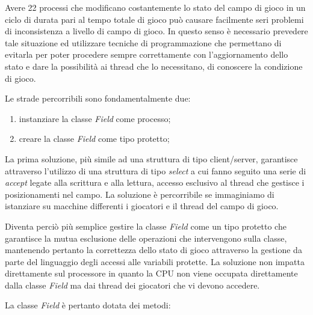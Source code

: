 \documentclass[aps,letterpaper,10pt]{article}
\begin{document}
Avere 22 processi che modificano costantemente lo stato del campo di gioco in un ciclo di durata pari al tempo totale di
gioco pu\`o causare facilmente seri problemi di inconsistenza a livello di campo di gioco. In questo senso \`e
necessario prevedere tale situazione ed utilizzare tecniche di programmazione che permettano di evitarla per poter
procedere sempre correttamente con l'aggiornamento dello stato e dare la possibilit\`a ai thread che lo necessitano, di
conoscere la condizione di gioco. \vspace{3mm}

Le strade percorribili sono fondamentalmente due:
\begin{enumerate}
	\item instanziare la classe \emph{Field} come processo;
	\item creare la classe \emph{Field} come tipo protetto;
\end{enumerate}

La prima soluzione, pi\`u simile ad una struttura di tipo client/server, garantisce attraverso l'utilizzo di una
struttura di tipo \emph{select} a cui fanno seguito una serie di \emph{accept} legate alla scrittura e alla lettura,
accesso esclusivo al thread che gestisce i posizionamenti nel campo. La soluzione \`e percorribile se immaginiamo di
istanziare su macchine differenti i giocatori e il thread del campo di gioco. \vspace{3mm}

Diventa perci\`o pi\`u semplice gestire la classe \emph{Field} come un tipo protetto che garantisce la mutua esclusione
delle operazioni che intervengono sulla classe, mantenendo pertanto la correttezza dello stato di gioco attraverso la
gestione da parte del linguaggio degli accessi alle variabili protette. La soluzione non impatta direttamente sul
processore in quanto la CPU non viene occupata direttamente dalla classe \emph{Field} ma dai thread dei giocatori che vi
devono accedere. \vspace{3mm}

La classe \emph{Field} \`e pertanto dotata dei metodi: \vspace{3mm}
\end{document}
